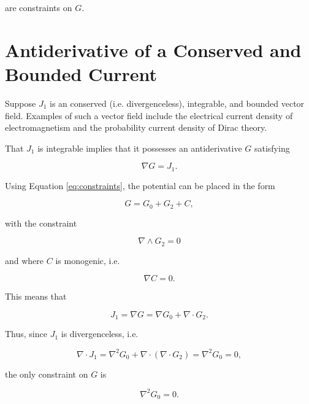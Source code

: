 \documentclass{article}
\begin{document}
are constraints on $G$.

\section{Antiderivative of a Conserved and Bounded Current}

Suppose $J_1$ is an conserved (i.e. divergenceless), integrable, and bounded vector field. Examples of such a vector field include the electrical current density of electromagnetism and the probability current density of Dirac theory.

That $J_1$ is integrable implies that it possesses an antiderivative $G$ satisfying

  \begin{equation}
    \nabla G = J_1.
  \end{equation}

  Using Equation \ref{eq:constraints}, the potential can be placed in the form

  \begin{equation}
    G = G_0 + G_2 + C,
  \end{equation}

  with the constraint

  \begin{equation}
    \nabla \wedge G_2 = 0\label{eq:curl-free}
  \end{equation}

  and where $C$ is monogenic, i.e.

  \begin{equation}
    \nabla C = 0.\label{eq:monogenic}
  \end{equation}

  This means that

  \begin{equation}
    J_1 = \nabla G = \nabla G_0 + \nabla \cdot G_2.\label{eq:current-conclusion-1}
  \end{equation}

  Thus, since $J_1$ is divergenceless, i.e.

  \begin{equation}
    \nabla \cdot J_1 = \nabla^2 G_0 + \nabla \cdot (\nabla \cdot G_2) = \nabla^2 G_0 = 0,
  \end{equation} 

  the only constraint on $G$ is

  \begin{equation}
    \nabla^2 G_0 = 0.\label{eq:harmonic}
  \end{equation}
\end{document}
